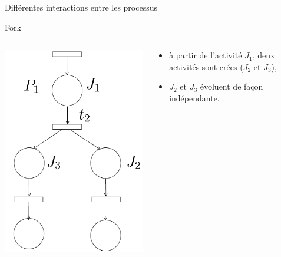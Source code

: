\documentclass[compress]{beamer}
\begin{document}
\begin{frame}{Différentes interactions entre les processus}
\begin{block}{Fork}
\begin{columns}
	\begin{column}{.3\linewidth}
		\begin{center}
			\includegraphics[width=\linewidth]{div}
		\end{center}
	\end{column}
	\begin{column}{.7\linewidth}
		\begin{itemize}
		\item à partir de l'activité $J_1$, deux activités sont crées ($J_2$ et $J_3$),
		\item $J_2$ et  $J_3$ évoluent de façon indépendante.
		\end{itemize} 
	\end{column}
\end{columns}
\end{block}
\end{frame}
\end{document}
